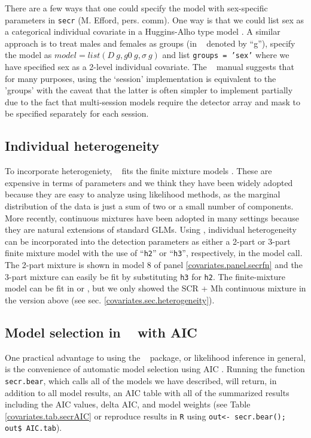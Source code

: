 There are a few ways that one could
specify the model with sex-specific parameters  in \mbox{\tt secr} (M. Efford, pers. comm).  One way is that we could
list sex as a categorical individual covariate in a Huggins-Alho type
model \citep{borchers_efford:2008}.
 A similar approach is to treat males and 
females as groups (in \secr~ denoted by ``g''), specify the
model as $model = list(D~g, g0~g, \sigma~g)$ and list \mbox{\tt groups = 'sex'}
where we have specified sex as a 2-level individual covariate.    The \secr~ manual suggests that for many purposes,
using the `session' implementation is equivalent to the 'groups' with the caveat that the latter is often simpler
to implement partially due to the fact that multi-session models require the detector array and mask to be 
specified separately for each session.


\subsection{Individual heterogeneity}
\label{covariates.sec.secrH2}

To incorporate heterogeniety, \secr~ fits the
finite mixture models \citep{norris_pollock:1996,
  pledger:2000}. These are expensive in terms of parameters and we think 
they have been widely adopted because they are easy to analyze using
likelihood methods, as the marginal distribution of the data is just a
sum of two or a small number of components.
More recently, continuous mixtures have been adopted in
many settings because they are natural extensions of standard GLMs. 
Using \secr,  individual heterogeneity can be incorporated
into the detection parameters as either a 2-part or 3-part finite
mixture model 
with the use of ``\mbox{\tt h2}'' or
``\mbox{\tt h3}'', respectively, in the
model call.   The 2-part mixture is shown in model 8 of panel
\ref{covariates.panel.secrfn} and the 3-part mixture can easily be fit by
substituting \mbox{\tt h3} for \mbox{\tt h2}.  
The finite-mixture model 
can be fit in \jags or \bugs, but we only showed
the SCR + Mh continuous mixture in the version above (see
sec. \ref{covariates.sec.heterogeneity}).



\subsection{Model selection in \secr~ with AIC}

One practical advantage to using the \secr~ package, or likelihood
inference in general, is the convenience of automatic model selection
using AIC \citep{burnham_anderson:1998}.
Running the function {\tt secr.bear}, which calls all of the models we
have described, will return, in addition to all model results, 
an AIC table with all of the summarized results including the AIC values,
delta AIC, and model weights (see Table \ref{covariates.tab.secrAIC}
or reproduce results in {\tt R} using {\tt out<- secr.bear(); out\$ AIC.tab}). 

